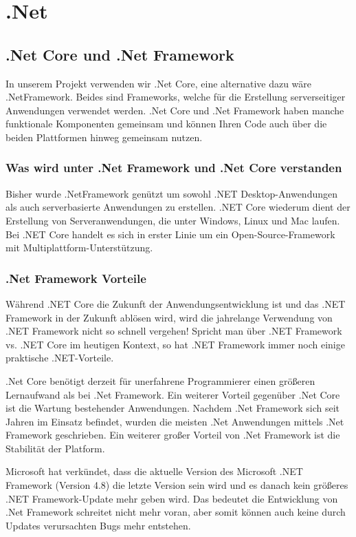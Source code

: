 \section{.Net}


\subsection{.Net Core und .Net Framework}

In unserem Projekt verwenden wir .Net Core, eine alternative dazu wäre .NetFramework.
Beides sind Frameworks, welche für die Erstellung serverseitiger Anwendungen verwendet werden. 
.Net Core und .Net Framework haben manche funktionale Komponenten gemeinsam und können Ihren Code auch über die beiden Plattformen hinweg gemeinsam nutzen.

\subsubsection*{ Was wird unter .Net Framework und .Net Core verstanden}
Bisher wurde .NetFramework genützt um sowohl .NET Desktop-Anwendungen als auch serverbasierte Anwendungen zu erstellen.
.NET Core wiederum dient der Erstellung von Serveranwendungen, die unter Windows, Linux und Mac laufen.
Bei .NET Core handelt es sich in erster Linie um ein Open-Source-Framework mit Multiplattform-Unterstützung.


\subsubsection*{.Net Framework Vorteile}
Während .NET Core die Zukunft der Anwendungsentwicklung ist und das .NET Framework in der Zukunft ablösen wird, wird die jahrelange Verwendung von .NET Framework nicht so schnell vergehen!
Spricht man über .NET Framework vs. .NET Core im heutigen Kontext, so hat .NET Framework immer noch einige praktische .NET-Vorteile.

.Net Core benötigt derzeit für unerfahrene Programmierer einen größeren Lernaufwand als bei .Net Framework. 
Ein weiterer Vorteil gegenüber .Net Core ist die Wartung bestehender Anwendungen. 
Nachdem .Net Framework sich seit Jahren im Einsatz befindet, wurden die meisten .Net Anwendungen mittels .Net Framework geschrieben. 
Ein weiterer großer Vorteil von .Net Framework ist die Stabilität der Platform. 

Microsoft hat verkündet, dass die aktuelle Version des Microsoft .NET Framework (Version 4.8) die letzte Version sein wird und es danach kein größeres .NET Framework-Update mehr geben wird.
Das bedeutet die Entwicklung von .Net Framework schreitet nicht mehr voran, aber somit können auch keine durch Updates verursachten Bugs mehr entstehen.

